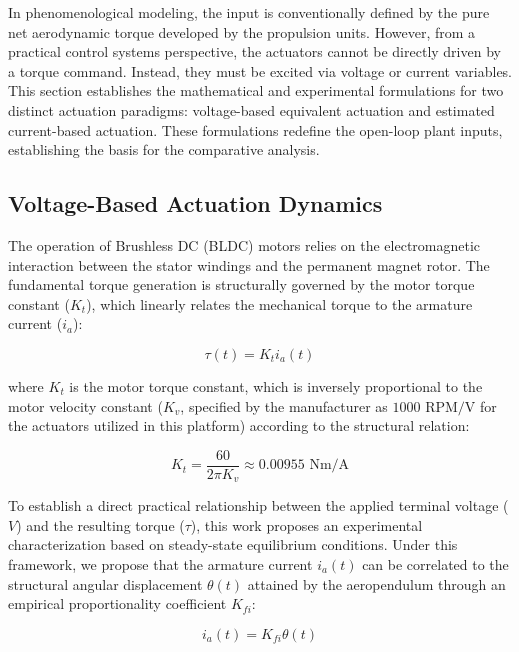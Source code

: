 \documentclass[pdflatex,sn-mathphys-num,iicol]{sn-jnl}
\theoremstyle{thmstyleone}%
\theoremstyle{thmstyletwo}%
\theoremstyle{thmstylethree}%
\begin{document}
In phenomenological modeling, the input is conventionally defined by the pure net aerodynamic torque developed by the propulsion units. However, from a practical control systems perspective, the actuators cannot be directly driven by a torque command. Instead, they must be excited via voltage or current variables. This section establishes the mathematical and experimental formulations for two distinct actuation paradigms: voltage-based equivalent actuation and estimated current-based actuation. These formulations redefine the open-loop plant inputs, establishing the basis for the comparative analysis.

\subsection{Voltage-Based Actuation Dynamics}
\label{sub:voltage_actuation}

The operation of Brushless DC (BLDC) motors relies on the electromagnetic interaction between the stator windings and the permanent magnet rotor. The fundamental torque generation is structurally governed by the motor torque constant ($K_t$), which linearly relates the mechanical torque to the armature current ($i_a$):

\begin{equation}
\tau(t) = K_t i_a(t)
\label{eq:torque_kt}
\end{equation}

\noindent where $K_t$ is the motor torque constant, which is inversely proportional to the motor velocity constant ($K_v$, specified by the manufacturer as $1000\text{ RPM/V}$ for the actuators utilized in this platform) according to the structural relation:

\begin{equation}
K_t = \frac{60}{2\pi K_v} \approx 0.00955 \text{ N}\text{m/A}
\label{eq:kt_value}
\end{equation}

To establish a direct practical relationship between the applied terminal voltage ($V$) and the resulting torque ($\tau$), this work proposes an experimental characterization based on steady-state equilibrium conditions. Under this framework, we propose that the armature current $i_a(t)$ can be correlated to the structural angular displacement $\theta(t)$ attained by the aeropendulum through an empirical proportionality coefficient $K_{fi}$:

\begin{equation}
i_a(t) = K_{fi} \theta(t)
\label{eq:ia_kfi}
\end{equation}
\end{document}
